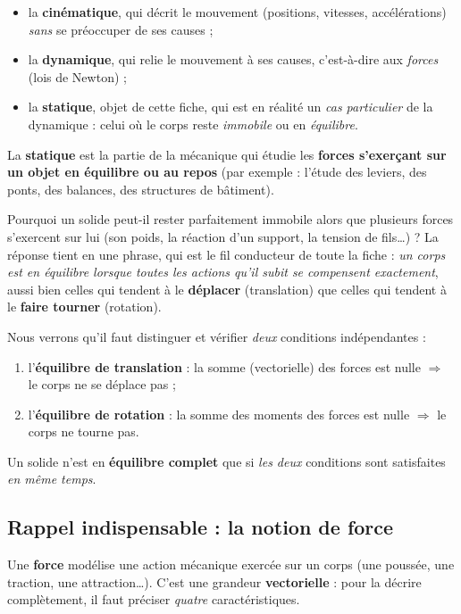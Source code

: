 \documentclass[11pt,a4paper]{article}
\begin{document}
\begin{itemize}[leftmargin=1.6em,topsep=3pt,itemsep=2pt]
  \item la \textbf{cinématique}, qui décrit le mouvement (positions, vitesses, accélérations)
        \emph{sans} se préoccuper de ses causes ;
  \item la \textbf{dynamique}, qui relie le mouvement à ses causes, c'est-à-dire aux \emph{forces}
        (lois de Newton) ;
  \item la \textbf{statique}, objet de cette fiche, qui est en réalité un \emph{cas particulier} de la
        dynamique : celui où le corps reste \emph{immobile} ou en \emph{équilibre}.
\end{itemize}

\begin{definition}[la statique]
La \textbf{statique} est la partie de la mécanique qui étudie les \textbf{forces s'exerçant sur un
objet en équilibre ou au repos} (par exemple : l'étude des leviers, des ponts, des balances,
des structures de bâtiment).
\end{definition}

Pourquoi un solide peut-il rester parfaitement immobile alors que plusieurs forces s'exercent
sur lui (son poids, la réaction d'un support, la tension de fils\dots) ? La réponse tient en une
phrase, qui est le fil conducteur de toute la fiche : \emph{un corps est en équilibre lorsque toutes
les actions qu'il subit se compensent exactement}, aussi bien celles qui tendent à le
\textbf{déplacer} (translation) que celles qui tendent à le \textbf{faire tourner} (rotation).

\begin{remarque}
Nous verrons qu'il faut distinguer et vérifier \emph{deux} conditions indépendantes :
\begin{enumerate}[leftmargin=1.8em,topsep=2pt,itemsep=1pt]
  \item l'\textbf{équilibre de translation} : la somme (vectorielle) des forces est nulle
        $\Rightarrow$ le corps ne se déplace pas ;
  \item l'\textbf{équilibre de rotation} : la somme des moments des forces est nulle
        $\Rightarrow$ le corps ne tourne pas.
\end{enumerate}
Un solide n'est en \textbf{équilibre complet} que si \emph{les deux} conditions sont satisfaites
\emph{en même temps}.
\end{remarque}

\subsection{Rappel indispensable : la notion de force}
Une \textbf{force} modélise une action mécanique exercée sur un corps (une poussée, une traction,
une attraction\dots). C'est une grandeur \textbf{vectorielle} : pour la décrire complètement, il faut
préciser \emph{quatre} caractéristiques.
\end{document}
